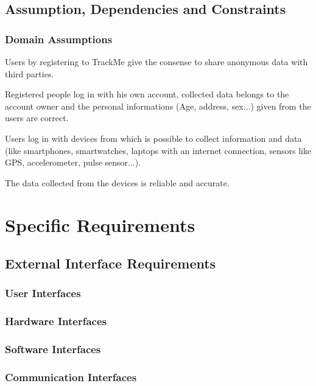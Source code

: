 \documentclass[a4paper]{article}
\begin{document}
\subsection{Assumption, Dependencies and Constraints}

\subsubsection{Domain Assumptions}


\begin{enumerate}[label={[D.\arabic*]}]
    \item Users by registering to TrackMe give the consense to share anonymous data with third parties.
    \item Registered people log in with his own account, collected data belongs to the account owner and the personal informations (Age, address, sex...) given from the users are correct.
    \item Users log in with devices from which is possible to collect information and data (like smartphones, smartwatches, laptops with an internet connection, sensors like GPS, accelerometer, pulse sensor...).
    \item The data collected from the devices is reliable and accurate.
\end{enumerate}


\section{Specific Requirements}

\subsection{External Interface Requirements}

\subsubsection{User Interfaces}

\subsubsection{Hardware Interfaces}

\subsubsection{Software Interfaces}

\subsubsection{Communication Interfaces}
\end{document}
